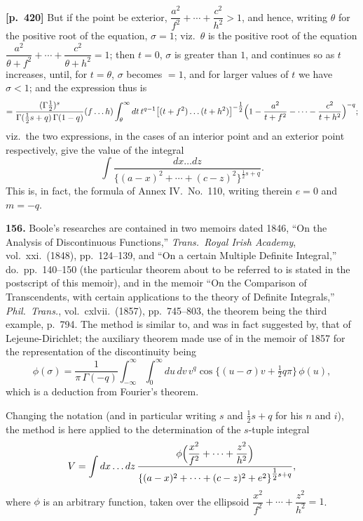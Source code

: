\documentclass[11pt,a4paper]{article}
\begin{document}
\bigskip
\noindent\textbf{[p.~420]}\quad
But if the point be exterior, $\dfrac{a^{2}}{f^{2}} + \cdots + \dfrac{c^{2}}{h^{2}} > 1$, and hence, writing $\theta$ for the positive root of the equation, $\sigma = 1$; viz.\ $\theta$ is the positive root of the equation $\dfrac{a^{2}}{\theta+f^{2}} + \cdots + \dfrac{c^{2}}{\theta+h^{2}} = 1$; then $t = 0$, $\sigma$ is greater than $1$, and continues so as $t$ increases, until, for $t = \theta$, $\sigma$ becomes $= 1$, and for larger values of $t$ we have $\sigma < 1$; and the expression thus is
\[
= \frac{(\Gamma\tfrac{1}{2})^{s}}{\Gamma(\tfrac{1}{2}s+q)\,\Gamma(1-q)}(f\ldots h)\int_{\theta}^{\infty} dt\,t^{q-1}\bigl[(t+f^{2})\ldots(t+h^{2})\bigr]^{-\tfrac{1}{2}}\Bigl(1 - \frac{a^{2}}{t+f^{2}} - \cdots - \frac{c^{2}}{t+h^{2}}\Bigr)^{-q};
\]
viz.\ the two expressions, in the cases of an interior point and an exterior point respectively, give the value of the integral
\[
\int \frac{dx\ldots dz}{\{(a-x)^{2}+\cdots+(c-z)^{2}\}^{\tfrac{1}{2}s+q}}.
\]
This is, in fact, the formula of Annex IV.\ No.\ 110, writing therein $e = 0$ and $m = -q$.

\textbf{156.} Boole's researches are contained in two memoirs dated 1846, ``On the Analysis of Discontinuous Functions,'' \textit{Trans.\ Royal Irish Academy}, vol.\ xxi.\ (1848), pp.\ 124--139, and ``On a certain Multiple Definite Integral,'' do.\ pp.\ 140--150 (the particular theorem about to be referred to is stated in the postscript of this memoir), and in the memoir ``On the Comparison of Transcendents, with certain applications to the theory of Definite Integrals,'' \textit{Phil.\ Trans.}, vol.\ cxlvii.\ (1857), pp.\ 745--803, the theorem being the third example, p.~794. The method is similar to, and was in fact suggested by, that of Lejeune-Dirichlet; the auxiliary theorem made use of in the memoir of 1857 for the representation of the discontinuity being
\[
\phi(\sigma) = \frac{1}{\pi\,\Gamma(-q)}\int_{-\infty}^{\infty}\int_{0}^{\infty} du\,dv\,v^{q}\cos\{(u-\sigma)v + \tfrac{1}{2}q\pi\}\,\phi(u),
\]
which is a deduction from Fourier's theorem.

Changing the notation (and in particular writing $s$ and $\tfrac{1}{2}s+q$ for his $n$ and $i$), the method is here applied to the determination of the $s$-tuple integral
\[
V = \int dx\ldots dz\,\frac{\phi\Bigl(\dfrac{x^{2}}{f^{2}} + \cdots + \dfrac{z^{2}}{h^{2}}\Bigr)}{\{(a-x)^{2}+\cdots+(c-z)^{2}+e^{2}\}^{\tfrac{1}{2}s+q}},
\]
where $\phi$ is an arbitrary function, taken over the ellipsoid $\dfrac{x^{2}}{f^{2}} + \cdots + \dfrac{z^{2}}{h^{2}} = 1$.
\end{document}
